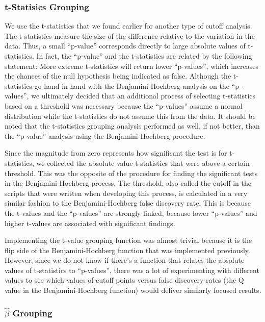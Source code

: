 \subsubsection{t-Statisics Grouping}

\par We use the t-statistics that we found earlier for another type of cutoff
analysis. The t-statistics measure the size of the difference relative to the 
variation in the data. Thus, a small ``p-value'' corresponds directly to large
absolute values of t-statistics. In fact, the ``p-value'' and the t-statistics
are related by the following statement: More extreme t-statistics will return 
lower ``p-values'', which increases the chances of the null hypothesis being 
indicated as false. Although the t-statistics go hand in hand with the 
Benjamini-Hochberg analysis on the ``p-values'', we ultimately decided that an 
additional process of selecting t-statistics based on a threshold was 
necessary because the ``p-values'' assume a normal distribution while the 
t-statistics do not assume this from the data. It should be noted that the 
t-statistics grouping analysis performed as well, if not better, than the 
``p-value'' analysis using the Benjamini-Hochberg procedure.

\par Since the magnitude from zero represents how significant the test is for
t-statistics, we collected the absolute value t-statistics that were above a 
certain threshold. This was the opposite of the procedure for finding the 
significant tests in the Benjamini-Hochberg process. The threshold, also called
the cutoff in the scripts that were written when developing this process, is 
calculated in a very similar fashion to the Benjamini-Hochberg false discovery 
rate. This is because the t-values and the ``p-values'' are strongly linked,
because lower ``p-values'' and higher t-values are associated with significant 
findings. 

\par Implementing the t-value grouping function was almost trivial because it 
is the flip side of the Benjamini-Hochberg function that was implemented 
previously. However, since we do not know if there's a function that relates 
the absolute values of t-statistics to ``p-values'', there was a lot of 
experimenting with different values to see which values of cutoff points versus
false discovery rates (the Q value in the Benjamini-Hochberg function) would 
deliver similarly focused results.

\subsubsection{$\hat{\beta}$ Grouping}

